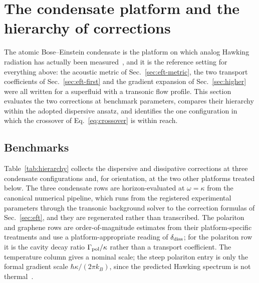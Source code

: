 \documentclass[aps,prd,reprint,nofootinbib,superscriptaddress]{revtex4-2}
\begin{document}
\section{The condensate platform and the hierarchy of corrections}
\label{sec:hierarchy}

The atomic Bose--Einstein condensate is the platform on which analog
Hawking radiation has actually been
measured~\cite{Steinhauer2016,deNova2019}, and it is the reference
setting for everything above: the acoustic metric of
Sec.~\ref{sec:eft-metric}, the two transport coefficients of
Sec.~\ref{sec:eft-first} and the gradient expansion of
Sec.~\ref{sec:higher} were all written for a superfluid with a
transonic flow profile. This section evaluates the two corrections at
benchmark parameters, compares their hierarchy within the adopted
dispersive ansatz, and
identifies the one configuration in which the crossover of
Eq.~\eqref{eq:crossover} is within reach.

\subsection{Benchmarks}
\label{sec:hier-bench}

Table~\ref{tab:hierarchy} collects the dispersive and dissipative
corrections at three condensate configurations and, for orientation, at
the two other platforms treated below. The three condensate rows are
horizon-evaluated at $\omega = \kappa$ from the canonical numerical
pipeline, which runs from the registered experimental parameters
through the transonic background solver to the correction formulas of
Sec.~\ref{sec:eft}, and they are regenerated rather than transcribed.
The polariton and graphene rows are order-of-magnitude estimates from
their platform-specific treatments and use a platform-appropriate
reading of $\delta_{\rm diss}$; for the polariton row it is the cavity
decay ratio $\Gamma_{\rm pol}/\kappa$ rather than a transport
coefficient. The temperature column gives a nominal scale; the steep
polariton entry is only the formal gradient scale $\hbar\kappa/(2\pi k_B)$,
since the predicted Hawking spectrum is not thermal~\cite{Falque2025}.

\begin{table}[!t]
\centering
\caption{Dispersive and dissipative corrections at benchmark
configurations. $\delta_{\rm disp} = -(\pi/6)D^2$ is the adopted
phenomenological dispersive correction of Eq.~\eqref{eq:delta-disp} and
$\delta_{\rm diss} = \Gamma_H/\kappa$ the leading dissipative
correction of Eq.~\eqref{eq:delta-diss}. The polariton dissipative entries
give the cavity validity ratio $\Gamma_{\rm pol}/\kappa$ outside weak
decay. The steep-horizon temperature entry gives a formal gradient scale.
At $\omega=\kappa$, the two corrections give dimensionless fractional
shifts of $T_{\rm eff}$ for the condensate rows.}
\label{tab:hierarchy}

\end{table}
\end{document}
